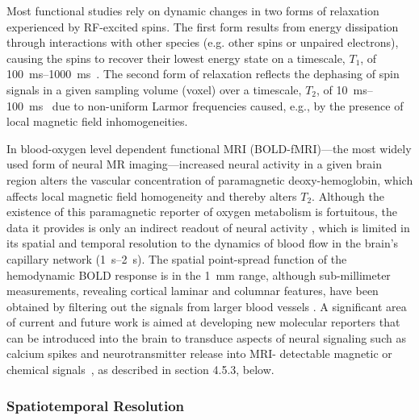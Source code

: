 Most functional studies rely on dynamic changes in two forms of relaxation experienced by RF-excited spins.
The first form results from energy dissipation through interactions with other species (e.g. other spins or unpaired electrons), causing the spins to recover their lowest energy state on a timescale, $T_1$, of \SIrange{100}{1000}{\milli\second}~\cite{rooney07}.
The second form of relaxation reflects the dephasing of spin signals in a given sampling volume (voxel) over a timescale, $T_2$, of \SIrange{10}{100}{\milli\second}~\cite{deichmann95} due to non-uniform Larmor frequencies caused, e.g., by the presence of local magnetic field inhomogeneities.

In blood-oxygen level dependent \cite{ogawa1990oxygenation} functional MRI (BOLD-fMRI)---the most widely used form of neural MR imaging---increased neural activity in a given brain region alters the vascular concentration of paramagnetic deoxy-hemoglobin, which affects local magnetic field homogeneity and thereby alters $T_2$.
Although the existence of this paramagnetic reporter of oxygen metabolism is fortuitous, the data it provides is only an indirect readout of neural activity \cite{sirotin2009anticipatory, logothetis2008we, jukovskaya2011does}, which is limited in its spatial and temporal resolution to the dynamics of blood flow in the brain's capillary network (\SIrange{1}{2}{\second}). 
The spatial point-spread function of the hemodynamic BOLD response is in the \SI{1}{\milli\meter} range, although sub-millimeter measurements, revealing cortical laminar and columnar features, have been obtained by filtering out the signals from larger blood vessels \cite{bandettini2009functional}.
A significant area of current and future work is aimed at developing new molecular reporters that can be introduced into the brain to transduce aspects of neural signaling such as calcium spikes and neurotransmitter release into MRI- detectable magnetic or chemical signals~\cite{shapiro10,koretsky12,hsieh12}, as described in section 4.5.3, below.

\subsubsection{Spatiotemporal Resolution}

